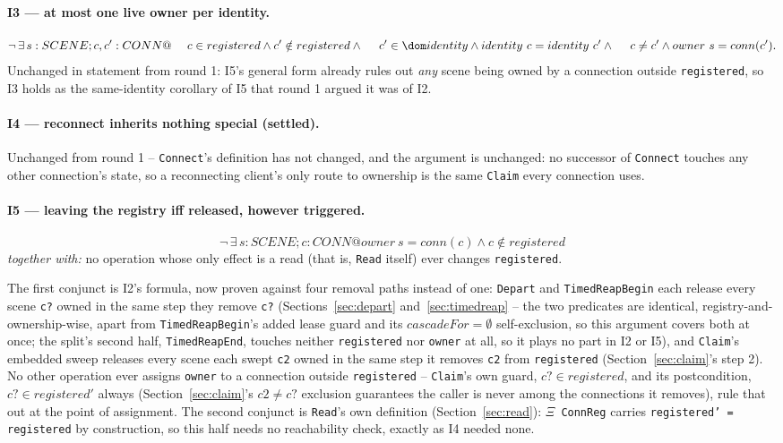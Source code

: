 \documentclass[a4paper,10pt,fleqn]{article}
\begin{document}
\paragraph{I3 --- at most one live owner per identity.}
\[
  \lnot\, \exists\, s : SCENE; c, c' : CONN @ \\
  \quad~ c \in registered \land c' \notin registered \land \\
  \quad~ c' \in \dom identity \land identity~c = identity~c' \land \\
  \quad~ c \neq c' \land owner~s = conn(c').
\]
Unchanged in statement from round 1: I5's general form already rules out
\emph{any} scene being owned by a connection outside \texttt{registered},
so I3 holds as the same-identity corollary of I5 that round 1 argued it
was of I2.

\paragraph{I4 --- reconnect inherits nothing special (settled).}
Unchanged from round 1 -- \texttt{Connect}'s definition has not changed,
and the argument is unchanged: no successor of \texttt{Connect} touches
any other connection's state, so a reconnecting client's only route to
ownership is the same \texttt{Claim} every connection uses.

\paragraph{I5 --- leaving the registry iff released, however triggered.}
\[
  \lnot\, \exists\, s : SCENE; c : CONN @
    owner~s = conn(c) \land c \notin registered
\]
\emph{together with:} no operation whose only effect is a read (that is,
\texttt{Read} itself) ever changes \texttt{registered}.

The first conjunct is I2's formula, now proven against four removal
paths instead of one: \texttt{Depart} and \texttt{TimedReapBegin} each
release every scene \texttt{c?} owned in the same step they remove
\texttt{c?} (Sections~\ref{sec:depart} and~\ref{sec:timedreap} -- the two
predicates are identical, registry-and-ownership-wise, apart from
\texttt{TimedReapBegin}'s added lease guard and its
\texttt{$cascadeFor = \emptyset$} self-exclusion, so this argument covers
both at once; the split's second half, \texttt{TimedReapEnd}, touches
neither \texttt{registered} nor \texttt{owner} at all, so it plays no part
in I2 or I5), and \texttt{Claim}'s embedded sweep
releases every scene each swept \texttt{c2} owned in the same step it
removes \texttt{c2} from \texttt{registered} (Section~\ref{sec:claim}'s
step 2). No other operation ever assigns \texttt{owner} to a connection
outside \texttt{registered} -- \texttt{Claim}'s own guard,
\texttt{$c? \in registered$}, and its postcondition,
\texttt{$c? \in registered'$} always (Section~\ref{sec:claim}'s
\(c2 \neq c?\) exclusion guarantees the caller is never among the
connections it removes), rule that out at the point of assignment. The
second conjunct is \texttt{Read}'s own definition
(Section~\ref{sec:read}): \texttt{$\Xi$ ConnReg} carries
\texttt{registered' = registered} by construction, so this half needs no
reachability check, exactly as I4 needed none.
\end{document}
